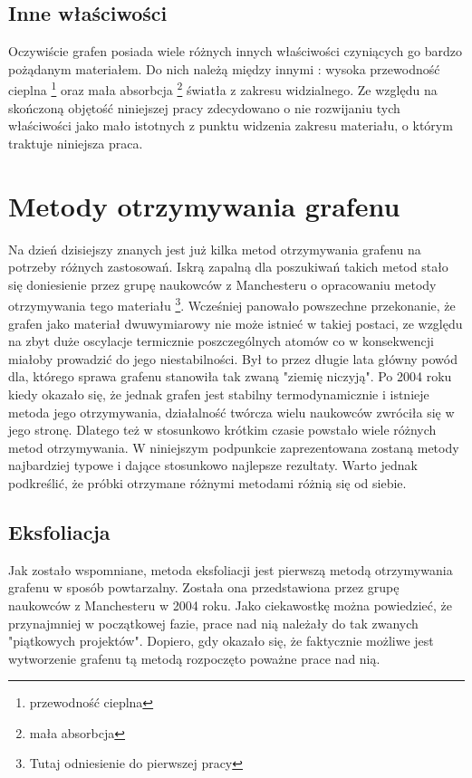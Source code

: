 	\subsection{Inne właściwości}
		
	Oczywiście grafen posiada wiele różnych innych właściwości czyniących go bardzo pożądanym materiałem. Do nich należą między innymi : wysoka przewodność cieplna \footnote{przewodność cieplna} oraz mała absorbcja \footnote{mała absorbcja} 
	światła z zakresu widzialnego. Ze względu na skończoną objętość niniejszej pracy zdecydowano o nie rozwijaniu 
	tych właściwości jako mało istotnych z punktu widzenia zakresu materiału, o którym traktuje niniejsza praca.
	
\section{Metody otrzymywania grafenu}
	Na dzień dzisiejszy znanych jest już kilka metod otrzymywania grafenu na potrzeby różnych zastosowań. Iskrą 
	zapalną dla poszukiwań takich metod stało się doniesienie przez grupę naukowców z Manchesteru o opracowaniu
	metody otrzymywania tego materiału \footnote{Tutaj odniesienie do pierwszej pracy}. Wcześniej panowało
	powszechne przekonanie, że grafen jako materiał dwuwymiarowy nie może istnieć w takiej postaci, ze względu
	na zbyt duże oscylacje termicznie poszczególnych atomów co w konsekwencji miałoby prowadzić do jego niestabilności.
	Był to przez długie lata główny powód dla, którego sprawa grafenu stanowiła tak zwaną "ziemię niczyją".
	Po 2004 roku kiedy okazało się, że jednak grafen jest stabilny termodynamicznie i istnieje metoda jego otrzymywania,
	działalność twórcza wielu naukowców zwróciła się w jego stronę. Dlatego też w stosunkowo krótkim czasie
	powstało wiele różnych metod otrzymywania. W niniejszym podpunkcie zaprezentowana zostaną metody 
	najbardziej typowe i dające stosunkowo najlepsze rezultaty. Warto jednak podkreślić, że próbki
	otrzymane różnymi metodami różnią się od siebie.

	\subsection{Eksfoliacja}
	
	Jak zostało wspomniane, metoda eksfoliacji jest pierwszą metodą otrzymywania grafenu w sposób powtarzalny.
	Została ona przedstawiona przez grupę naukowców z Manchesteru w 2004 roku. Jako ciekawostkę można powiedzieć,
	że przynajmniej w początkowej fazie, prace nad nią należały do tak zwanych "piątkowych projektów". Dopiero, 
	gdy okazało się, że faktycznie możliwe jest wytworzenie grafenu tą metodą rozpoczęto poważne prace nad nią.
	

